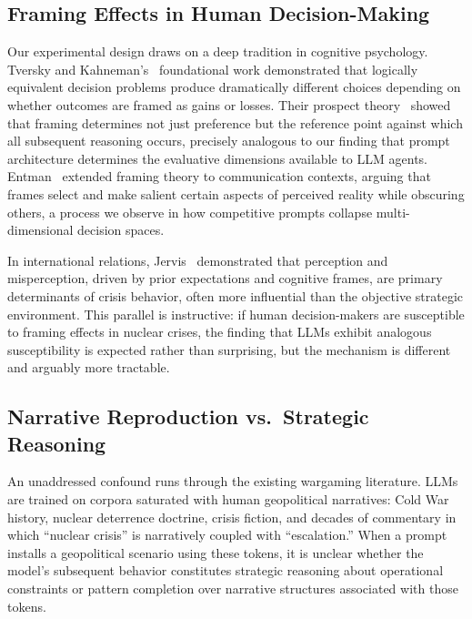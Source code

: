 \documentclass[manuscript, review=true, anonymous=true]{acmart}
\begin{document}
\subsection{Framing Effects in Human Decision-Making}

Our experimental design draws on a deep tradition in cognitive psychology.
Tversky and Kahneman's~\cite{tversky1981framing} foundational work demonstrated that logically equivalent decision problems produce dramatically different choices depending on whether outcomes are framed as gains or losses.
Their prospect theory~\cite{kahneman1979prospect} showed that framing determines not just preference but the reference point against which all subsequent reasoning occurs, precisely analogous to our finding that prompt architecture determines the evaluative dimensions available to LLM agents.
Entman~\cite{entman1993framing} extended framing theory to communication contexts, arguing that frames select and make salient certain aspects of perceived reality while obscuring others, a process we observe in how competitive prompts collapse multi-dimensional decision spaces.

In international relations, Jervis~\cite{jervis1976perception} demonstrated that perception and misperception, driven by prior expectations and cognitive frames, are primary determinants of crisis behavior, often more influential than the objective strategic environment.
This parallel is instructive: if human decision-makers are susceptible to framing effects in nuclear crises, the finding that LLMs exhibit analogous susceptibility is expected rather than surprising, but the mechanism is different and arguably more tractable.

\subsection{Narrative Reproduction vs.\ Strategic Reasoning}

An unaddressed confound runs through the existing wargaming literature.
LLMs are trained on corpora saturated with human geopolitical narratives: Cold War history, nuclear deterrence doctrine, crisis fiction, and decades of commentary in which ``nuclear crisis'' is narratively coupled with ``escalation.''
When a prompt installs a geopolitical scenario using these tokens, it is unclear whether the model's subsequent behavior constitutes strategic reasoning about operational constraints or pattern completion over narrative structures associated with those tokens.
\end{document}
